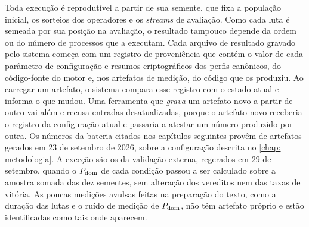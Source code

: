 Toda execução é reprodutível a partir de sua semente, que fixa a população inicial, os sorteios dos operadores e os \textit{streams} de avaliação. Como cada luta é semeada por sua posição na avaliação, o resultado tampouco depende da ordem ou do número de processos que a executam. Cada arquivo de resultado gravado pelo sistema começa com um registro de proveniência que contém o valor de cada parâmetro de configuração e resumos criptográficos dos perfis canônicos, do código-fonte do motor e, nos artefatos de medição, do código que os produziu. Ao carregar um artefato, o sistema compara esse registro com o estado atual e informa o que mudou. Uma ferramenta que \textit{grava} um artefato novo a partir de outro vai além e recusa entradas desatualizadas, porque o artefato novo receberia o registro da configuração atual e passaria a atestar um número produzido por outra. Os números da bateria citados nos capítulos seguintes provêm de artefatos gerados em 23 de setembro de 2026, sobre a configuração descrita no \autoref{chap: metodologia}. A exceção são os da validação externa, regerados em 29 de setembro, quando o $P_{\mathrm{dom}}$ de cada condição passou a ser calculado sobre a amostra somada das dez sementes, sem alteração dos vereditos nem das taxas de vitória. As poucas medições avulsas feitas na preparação do texto, como a duração das lutas e o ruído de medição de $P_{\mathrm{dom}}$, não têm artefato próprio e estão identificadas como tais onde aparecem.
